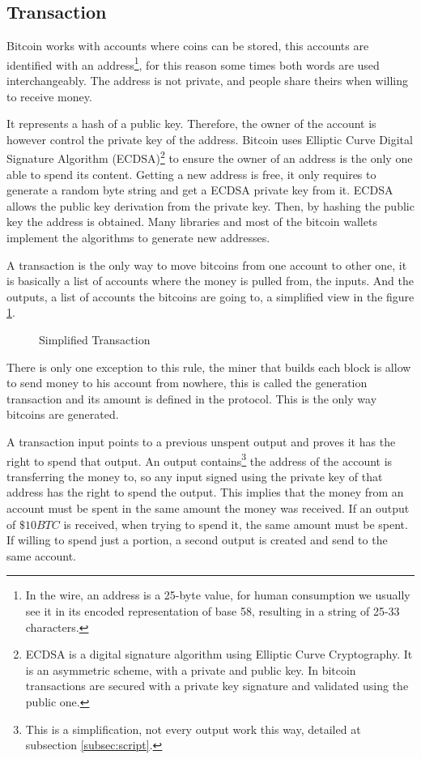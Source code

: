 \subsection{Transaction}\label{subsec:Transaction}
Bitcoin works with accounts where coins can be stored, this accounts are
  identified with an address\footnote{
  In the wire, an address is a 25-byte value, for human consumption we usually
    see it in its encoded representation of base 58, resulting in a string of
    25-33 characters.}, for this reason some times both words are used
  interchangeably.
The address is not private, and people share theirs when willing to receive
  money.

It represents a hash of a public key. Therefore, the owner of the account is
  however control the private key of the address.
Bitcoin uses Elliptic Curve Digital Signature Algorithm (ECDSA)\footnote{
  ECDSA is a digital signature algorithm using Elliptic Curve
    Cryptography. It is an asymmetric scheme, with a private and public key. In
    bitcoin transactions are secured with a private key signature and validated
    using the public one.} to ensure the owner of an address is the only one able
  to spend its content.
Getting a new address is free, it only requires to generate a random byte string
  and get a ECDSA private key from it. ECDSA allows the public key derivation
  from the private key. Then, by hashing the public key the address is obtained.
Many libraries and most of the bitcoin wallets implement the algorithms to
  generate new addresses.

A transaction is the only way to move bitcoins from one account to other one,
  it is basically a list of accounts where the money is pulled from, the
  inputs.
And the outputs, a list of accounts the bitcoins are going to, a simplified
  view in the figure \ref{fig:simplified_transaction}.

\begin{figure}
	\centering
	
	\caption{Simplified Transaction}
	\label{fig:simplified_transaction}
\end{figure}

There is only one exception to this rule, the miner that builds each block is
  allow to send money to his account from nowhere, this is called the generation
  transaction and its amount is defined in the protocol.
This is the only way bitcoins are generated.

A transaction input points to a previous unspent output and proves it has the
  right to spend that output.
An output contains\footnote{This is a simplification, not every output work this
  way, detailed at subsection \ref{subsec:script}.} the address of the account
  is transferring the money to, so any input signed using the private key of
  that address has the right to spend the output.
This implies that the money from an account must be spent in the same amount
  the money was received. If an output of $\$ 10BTC$ is received, when trying
  to spend it, the same amount must be spent. If willing to spend just a
  portion, a second output is created and send to the same account.

